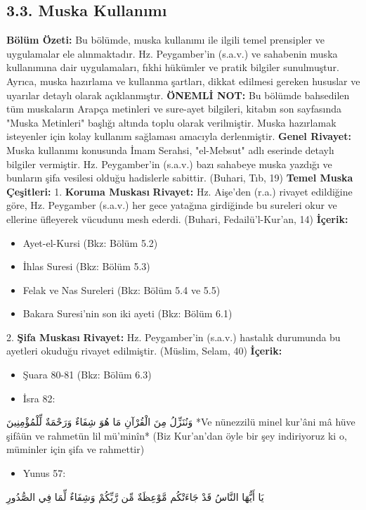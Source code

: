 \documentclass[12pt,a4paper]{article}
\begin{document}
\subsection{3.3. Muska Kullanımı}
\textbf{Bölüm Özeti:}
Bu bölümde, muska kullanımı ile ilgili temel prensipler ve uygulamalar ele alınmaktadır. Hz. Peygamber'in (s.a.v.) ve sahabenin muska kullanımına dair uygulamaları, fıkhi hükümler ve pratik bilgiler sunulmuştur. Ayrıca, muska hazırlama ve kullanma şartları, dikkat edilmesi gereken hususlar ve uyarılar detaylı olarak açıklanmıştır.
\textbf{ÖNEMLİ NOT:} Bu bölümde bahsedilen tüm muskaların Arapça metinleri ve sure-ayet bilgileri, kitabın son sayfasında "Muska Metinleri" başlığı altında toplu olarak verilmiştir. Muska hazırlamak isteyenler için kolay kullanım sağlaması amacıyla derlenmiştir.
\textbf{Genel Rivayet:} Muska kullanımı konusunda İmam Serahsi, "el-Mebsut" adlı eserinde detaylı bilgiler vermiştir. Hz. Peygamber'in (s.a.v.) bazı sahabeye muska yazdığı ve bunların şifa vesilesi olduğu hadislerle sabittir. (Buhari, Tıb, 19)
\textbf{Temel Muska Çeşitleri:}
1. \textbf{Koruma Muskası}
\textbf{Rivayet:} Hz. Aişe'den (r.a.) rivayet edildiğine göre, Hz. Peygamber (s.a.v.) her gece yatağına girdiğinde bu sureleri okur ve ellerine üfleyerek vücudunu mesh ederdi. (Buhari, Fedailü'l-Kur'an, 14)
\textbf{İçerik:}
\begin{itemize}
\item Ayet-el-Kursi (Bkz: Bölüm 5.2)
\item İhlas Suresi (Bkz: Bölüm 5.3)
\item Felak ve Nas Sureleri (Bkz: Bölüm 5.4 ve 5.5)
\item Bakara Suresi'nin son iki ayeti (Bkz: Bölüm 6.1)
\end{itemize}
2. \textbf{Şifa Muskası}
\textbf{Rivayet:} Hz. Peygamber'in (s.a.v.) hastalık durumunda bu ayetleri okuduğu rivayet edilmiştir. (Müslim, Selam, 40)
\textbf{İçerik:}
\begin{itemize}
\item Şuara 80-81 (Bkz: Bölüm 6.3)
\item İsra 82:
\end{itemize}
وَنُنَزِّلُ مِنَ الْقُرْآنِ مَا هُوَ شِفَاءٌ وَرَحْمَةٌ لِّلْمُؤْمِنِينَ
*Ve nünezzilü minel kur'âni mâ hüve şifâün ve rahmetün lil mü'minîn*
(Biz Kur'an'dan öyle bir şey indiriyoruz ki o, müminler için şifa ve rahmettir)
\begin{itemize}
\item Yunus 57:
\end{itemize}
يَا أَيُّهَا النَّاسُ قَدْ جَاءَتْكُم مَّوْعِظَةٌ مِّن رَّبِّكُمْ وَشِفَاءٌ لِّمَا فِي الصُّدُورِ
\end{document}
